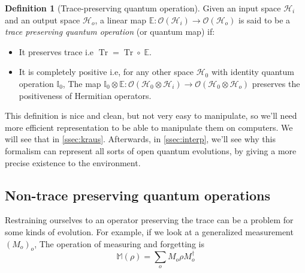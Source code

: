 \documentclass[10pt]{report}
\theoremstyle{plain}
\theoremstyle{definition}
\newtheorem{defn}{Definition}[chapter]
\theoremstyle{remark}
\DeclareMathOperator{\Tr}{Tr}
\begin{document}
\begin{defn}[Trace-preserving quantum operation]\label{def:tpqo}
  Given an input space $\mathcal{H}_i$ and an output space $\mathcal{H}_o$, a
  linear map $\mathbb E : \mathcal{O}(\mathcal{H}_i) \to
  \mathcal{O}(\mathcal{H}_o)$ is said to be a \emph{trace preserving quantum
    operation} (or quantum map) if:
  \begin{itemize}
  \item It preserves trace i.e $\Tr = \Tr \circ\; \mathbb E$.
  \item It is completely positive i.e, for any other space $\mathcal{H}_0$ with
    identity quantum operation $\mathbb I_0$, The map $\mathbb I_0 \otimes
    \mathbb E : \mathcal{O}(\mathcal{H}_0 \otimes \mathcal{H}_i) \to
    \mathcal{O}(\mathcal{H}_0 \otimes \mathcal{H}_o)$ preserves the positiveness
    of Hermitian operators.
  \end{itemize}
\end{defn}

This definition is nice and clean, but not very easy to manipulate, so we'll
need more efficient representation to be able to manipulate them on computers.
We will see that in \cref{ssec:kraus}. Afterwards, in \cref{ssec:interp}, we'll see
why this formalism can represent all sorts of open quantum evolutions, by giving
a more precise existence to the environment.

\subsection{Non-trace preserving quantum operations}

Restraining ourselves to an operator preserving the trace can be a problem for
some kinds of evolution. For example, if we look at a generalized measurement
${(M_o)}_o$, The operation of measuring and forgetting is
\[\mathbb{M}(\rho) = \sum_o M_o \rho M_o^\dagger\]
\end{document}
